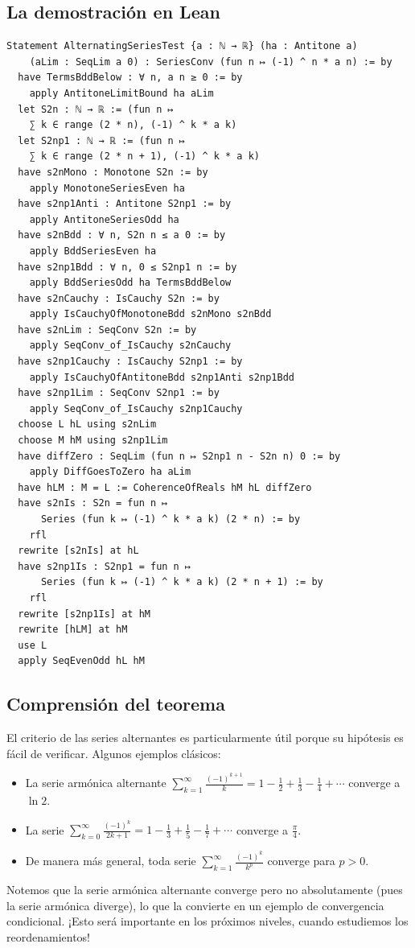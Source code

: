 \subsection{La demostración en Lean}

\begin{verbatim}
Statement AlternatingSeriesTest {a : ℕ → ℝ} (ha : Antitone a)
    (aLim : SeqLim a 0) : SeriesConv (fun n ↦ (-1) ^ n * a n) := by
  have TermsBddBelow : ∀ n, a n ≥ 0 := by
    apply AntitoneLimitBound ha aLim
  let S2n : ℕ → ℝ := (fun n ↦
    ∑ k ∈ range (2 * n), (-1) ^ k * a k)
  let S2np1 : ℕ → ℝ := (fun n ↦
    ∑ k ∈ range (2 * n + 1), (-1) ^ k * a k)
  have s2nMono : Monotone S2n := by
    apply MonotoneSeriesEven ha
  have s2np1Anti : Antitone S2np1 := by
    apply AntitoneSeriesOdd ha
  have s2nBdd : ∀ n, S2n n ≤ a 0 := by
    apply BddSeriesEven ha
  have s2np1Bdd : ∀ n, 0 ≤ S2np1 n := by
    apply BddSeriesOdd ha TermsBddBelow
  have s2nCauchy : IsCauchy S2n := by
    apply IsCauchyOfMonotoneBdd s2nMono s2nBdd
  have s2nLim : SeqConv S2n := by
    apply SeqConv_of_IsCauchy s2nCauchy
  have s2np1Cauchy : IsCauchy S2np1 := by
    apply IsCauchyOfAntitoneBdd s2np1Anti s2np1Bdd
  have s2np1Lim : SeqConv S2np1 := by
    apply SeqConv_of_IsCauchy s2np1Cauchy
  choose L hL using s2nLim
  choose M hM using s2np1Lim
  have diffZero : SeqLim (fun n ↦ S2np1 n - S2n n) 0 := by
    apply DiffGoesToZero ha aLim
  have hLM : M = L := CoherenceOfReals hM hL diffZero
  have s2nIs : S2n = fun n ↦
      Series (fun k ↦ (-1) ^ k * a k) (2 * n) := by
    rfl
  rewrite [s2nIs] at hL
  have s2np1Is : S2np1 = fun n ↦
      Series (fun k ↦ (-1) ^ k * a k) (2 * n + 1) := by
    rfl
  rewrite [s2np1Is] at hM
  rewrite [hLM] at hM
  use L
  apply SeqEvenOdd hL hM
\end{verbatim}

\subsection{Comprensión del teorema}

El criterio de las series alternantes es particularmente útil porque su hipótesis es fácil de verificar. Algunos ejemplos clásicos:
\begin{itemize}
  \item La serie armónica alternante $\sum_{k=1}^{\infty} \frac{(-1)^{k+1}}{k} = 1 - \frac12 + \frac13 - \frac14 + \cdots$ converge a $\ln 2$.
  \item La serie $\sum_{k=0}^{\infty} \frac{(-1)^k}{2k+1} = 1 - \frac13 + \frac15 - \frac17 + \cdots$ converge a $\frac{\pi}{4}$.
  \item De manera más general, toda serie $\sum_{k=1}^{\infty} \frac{(-1)^k}{k^p}$ converge para $p > 0$.
\end{itemize}
Notemos que la serie armónica alternante converge pero no absolutamente (pues la serie armónica diverge), lo que la convierte en un ejemplo de convergencia condicional. ¡Esto será importante en los próximos niveles, cuando estudiemos los reordenamientos!

